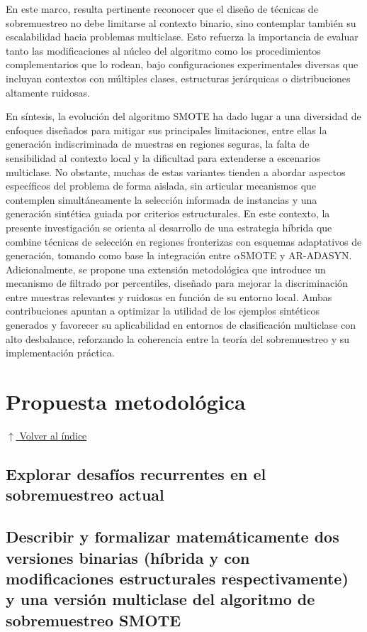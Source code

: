 \documentclass[12pt,a4paper]{article}
\begin{document}
En este marco, resulta pertinente reconocer que el diseño de técnicas de sobremuestreo no debe limitarse al contexto binario, sino contemplar también su escalabilidad hacia problemas multiclase. Esto refuerza la importancia de evaluar tanto las modificaciones al núcleo del algoritmo como los procedimientos complementarios que lo rodean, bajo configuraciones experimentales diversas que incluyan contextos con múltiples clases, estructuras jerárquicas o distribuciones altamente ruidosas.

En síntesis, la evolución del algoritmo SMOTE ha dado lugar a una diversidad de enfoques diseñados para mitigar sus principales limitaciones, entre ellas la generación indiscriminada de muestras en regiones seguras, la falta de sensibilidad al contexto local y la dificultad para extenderse a escenarios multiclase. No obstante, muchas de estas variantes tienden a abordar aspectos específicos del problema de forma aislada, sin articular mecanismos que contemplen simultáneamente la selección informada de instancias y una generación sintética guiada por criterios estructurales. En este contexto, la presente investigación se orienta al desarrollo de una estrategia híbrida que combine técnicas de selección en regiones fronterizas con esquemas adaptativos de generación, tomando como base la integración entre $ \alpha $SMOTE y AR-ADASYN. Adicionalmente, se propone una extensión metodológica que introduce un mecanismo de filtrado por percentiles, diseñado para mejorar la discriminación entre muestras relevantes y ruidosas en función de su entorno local. Ambas contribuciones apuntan a optimizar la utilidad de los ejemplos sintéticos generados y favorecer su aplicabilidad en entornos de clasificación multiclase con alto desbalance, reforzando la coherencia entre la teoría del sobremuestreo y su implementación práctica.



\section{Propuesta metodológica} \noindent\hyperlink{toc}{\small$\uparrow$ Volver al índice}
\subsection{Explorar desafíos recurrentes en el sobremuestreo actual}
\subsection{Describir y formalizar matemáticamente dos versiones binarias (híbrida y con modificaciones estructurales respectivamente) y una versión multiclase del algoritmo de sobremuestreo SMOTE}
\end{document}
